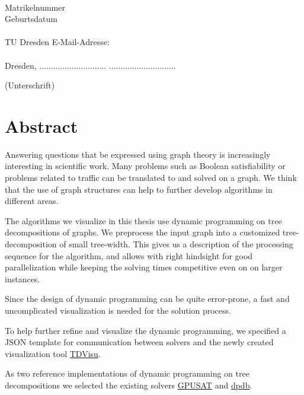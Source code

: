 \documentclass[a4paper, 12pt, bibliography=totoc]{scrartcl}
\begin{document}
\noindent
\myauthor \\
Matrikelnummer \mymatriculation\\
Geburtsdatum \mybirthday\\\\
TU Dresden E-Mail-Adresse:\\
 \myemail\\[40pt]


Dresden,  ............................. \hfill .............................
\begin{flushright}
	(Unterschrift)\hspace{1em}
\end{flushright}


\newpage

\section*{Abstract}
\vspace{4ex}

Answering questions that be expressed using graph theory is increasingly interesting in scientific work.
Many problems such as Boolean satisfiability or problems related to traffic can be translated to and solved on a graph.
We think that the use of graph structures can help to further develop algorithms in different areas.

The algorithms we visualize in this thesis use dynamic programming on tree decompositions of graphs.
We preprocess the input graph into a customized tree-decomposition of small tree-width.
This gives us a description of the processing sequence for the algorithm, and allows 
with right hindsight for good parallelization while keeping the solving times competitive even on on larger instances.

Since the design of dynamic programming can be quite error-prone, a fast and uncomplicated visualization is needed for the solution process.

To help further refine and visualize the dynamic programming,
we specified a JSON template for communication between solvers and the newly created visualization tool \href{https://github.com/VaeterchenFrost/tdvisu}{TDVisu}.

As two reference implementations of dynamic programming on tree decompositions we selected the existing solvers \href{https://github.com/daajoe/GPUSAT}{GPUSAT} and \href{https://github.com/hmarkus/dp_on_dbs}{dpdb}.\\
\end{document}
